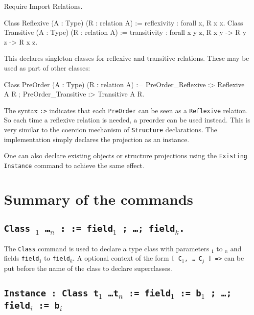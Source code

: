 \begin{coq_eval}
Require Import Relations.
\end{coq_eval}
\begin{coq_example*}
Class Reflexive (A : Type) (R : relation A) :=
  reflexivity : forall x, R x x.
Class Transitive (A : Type) (R : relation A) :=
  transitivity : forall x y z, R x y -> R y z -> R x z.
\end{coq_example*}

This declares singleton classes for reflexive and transitive relations. 
These may be used as part of other classes:

\begin{coq_example*}
Class PreOrder (A : Type) (R : relation A) :=
  PreOrder_Reflexive :> Reflexive A R ;
  PreOrder_Transitive :> Transitive A R.
\end{coq_example*}

The syntax \texttt{:>} indicates that each \texttt{PreOrder} can be seen
as a \texttt{Reflexive} relation. So each time a reflexive relation is
needed, a preorder can be used instead. This is very similar to the
coercion mechanism of \texttt{Structure} declarations.
The implementation simply declares the projection as an instance. 

One can also declare existing objects or structure
projections using the \texttt{Existing Instance} command to achieve the 
same effect.

\section{Summary of the commands
\label{TypeClassCommands}}

\subsection{\tt Class {\ident} {\binder$_1$ \ldots \binder$_n$} 
  : \sort := field$_1$ ; \ldots ; field$_k$.}
\label{Class}

The \texttt{Class} command is used to declare a type class with
parameters {\binder$_1$} to {\binder$_n$} and fields {\tt field$_1$} to
{\tt field$_k$}. A optional context of the form {\tt [ C$_1$, \ldots
  C$_j$ ] =>} can be put before the name of the class to declare
superclasses.

\subsection{\tt Instance {\ident} : {Class} {t$_1$ \ldots t$_n$}
  := field$_1$ := b$_1$ ; \ldots ; field$_i$ := b$_i$}
\label{Instance}

